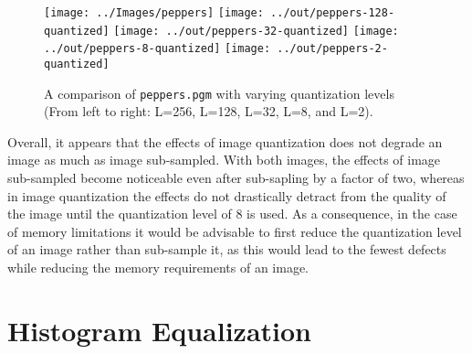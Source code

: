 \documentclass[headings=optiontoheadandtoc,listof=totoc,parskip=full]{scrartcl}
\begin{document}
\begin{figure}[ht]
	\centering
	\texttt{[image: ../Images/peppers]}
	\texttt{[image: ../out/peppers-128-quantized]}
	\texttt{[image: ../out/peppers-32-quantized]}
	\texttt{[image: ../out/peppers-8-quantized]}
	\texttt{[image: ../out/peppers-2-quantized]}
	\caption{A comparison of \texttt{peppers.pgm} with varying quantization levels (From left to right: L=256, L=128, L=32, L=8, and L=2).}
	\label{fig:equal-result-2}
\end{figure}

Overall, it appears that the effects of image quantization does not degrade an image as much as image sub-sampled. With both images, the effects of image sub-sampled become noticeable even after sub-sapling by a factor of two, whereas in image quantization the effects do not drastically detract from the quality of the image until the quantization level of 8 is used. As a consequence, in the case of memory limitations it would be advisable to first reduce the quantization level of an image rather than sub-sample it, as this would lead to the fewest defects while reducing the memory requirements of an image.

\section{Histogram Equalization}
\end{document}

